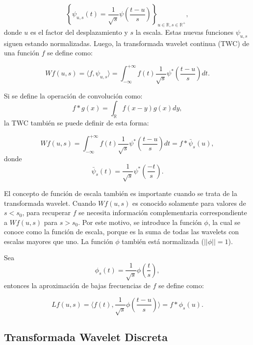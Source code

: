\begin{equation}
	\left\{ \psi_{u,s}(t)= \frac{1}{\sqrt{s}}\psi \left(\frac{t-u}{s}\right) \right\}_{u \in \mathbb{R}, s \in \mathbb{R^+}},
\end{equation}
\noindent donde $u$ es el factor del desplazamiento y $s$ la escala. Estas nuevas funciones $\psi_{u,s}$ siguen estando
normalizadas. Luego, la transformada wavelet continua (TWC) de una función $f$ se define como:

\begin{equation}
	Wf(u,s) = \langle f,\psi_{u,s} \rangle = \int_{-\infty}^{+\infty}  f(t)\frac{1}{\sqrt{s}}\psi^*\left(\frac{t-u}{s}\right) dt.
\end{equation}

Si se define la operación de convolución como:
\begin{equation}
	f*g(x) = \int_{\mathbb{R}} f(x-y)g(x)dy,
\end{equation}
\noindent la TWC también se puede definir de esta forma:

\begin{equation}
	Wf(u,s) = \int_{-\infty}^{+\infty}  f(t)\frac{1}{\sqrt{s}}\psi^*\left(\frac{t-u}{s}\right) dt = f*\bar \psi_s(u),
\end{equation}
\noindent donde $$\bar \psi_s(t)=\frac{1}{\sqrt{s}}\psi^*\left(\frac{-t}{s}\right).$$

El concepto de función de escala también es importante cuando se trata de la transformada wavelet. 
Cuando $Wf(u,s)$ es conocido solamente para valores de $s<s_0$, para recuperar $f$ se necesita información
complementaria correspondiente a $Wf(u,s)$ para $s>s_0$. Por este motivo, se introduce
la función $\phi$, la cual se conoce como la función de escala, porque es la suma de todas las wavelets con
escalas mayores que uno. La función $\phi$ también está normalizada ($||\phi||=1$).

Sea 
\begin{equation}
	\phi_s(t) = \frac{1}{\sqrt{s}}\phi\left(\frac{t}{s}\right),
\end{equation}
\noindent entonces la aproximación de bajas frecuencias de $f$ se define como:

\begin{equation}
	Lf(u,s) = \langle f(t),\frac{1}{\sqrt{s}}\phi\left(\frac{t-u}{s}\right) \rangle = f*\phi_s(u).
\end{equation}


\subsection{Transformada Wavelet Discreta }

